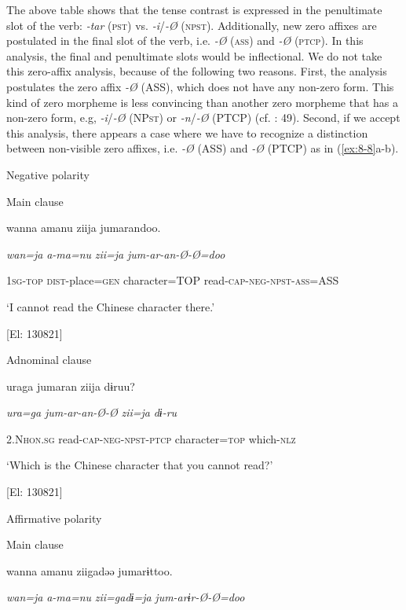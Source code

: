 The above table shows that the tense contrast is expressed in the penultimate slot of the verb: \textit{{}-tar} (\textsc{pst}) vs. \textit{{}-i}/\textit{{}-Ø} (\textsc{npst}). Additionally, new zero affixes are postulated in the final slot of the verb, i.e. \textit{{}-Ø} (\textsc{ass}) and \textit{{}-Ø} (\textsc{ptcp}). In this analysis, the final and penultimate slots would be inflectional. We do not take this zero-affix analysis, because of the following two reasons. First, the analysis postulates the zero affix \textit{{}-Ø} (ASS), which does not have any non-zero form. This kind of zero morpheme is less convincing than another zero morpheme that has a non-zero form, e.g, \textit{{}-i}/\textit{{}-Ø} (NP\textsc{st}) or \textit{{}-n}/\textit{{}-Ø} (PTCP) (cf. \citealt{Haas1974}: 49). Second, if we accept this analysis, there appears a case where we have to recognize a distinction between non-visible zero affixes, i.e. \textit{{}-Ø} (ASS) and \textit{{}-Ø} (PTCP) as in (\ref{ex:8-8}a-b).

\ea\label{ex:8-8}
  Negative polarity

\ea Main clause

    wanna  amanu  ziija  jumarandoo.

    \textit{wan=ja}  \textit{a-ma=nu}  \textit{zii=ja}  \textit{jum-ar-an-Ø-Ø=doo}

    1\textsc{sg}-\textsc{top}  \textsc{dist}-place=\textsc{gen}  character=TOP  read-\textsc{cap}-\textsc{neg}-\textsc{npst}-\textsc{ass}=ASS

    ‘I cannot read the Chinese character there.’

    [El: 130821]

\ex Adnominal clause

    uraga  jumaran  ziija  dɨruu?

    \textit{ura=ga}  \textit{jum-ar-an-Ø-Ø}  \textit{zii=ja}  \textit{dɨ-ru}

    2.N\textsc{hon}.\textsc{sg}  read-\textsc{cap}-\textsc{neg}-\textsc{npst}-\textsc{ptcp}  character=\textsc{top}  which-\textsc{nlz}

    ‘Which is the Chinese character that you cannot read?’

    [El: 130821]

  Affirmative polarity

\ex Main clause

    wanna  amanu  ziigadəə  jumarɨttoo.

    \textit{wan=ja}  \textit{a-ma=nu}  \textit{zii=gadɨ=ja}  \textit{jum-arɨr-Ø-Ø=doo}

